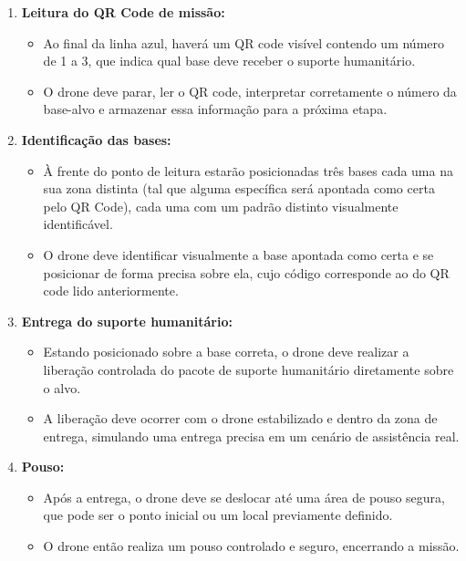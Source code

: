\begin{itemize}
\begin{itemize}
\begin{enumerate}
            \item \textbf{Leitura do QR Code de missão:}
            \begin{itemize}
                \item Ao final da linha azul, haverá um QR code visível contendo um número de 1 a 3, que indica qual base deve receber o suporte humanitário.
                \item O drone deve parar, ler o QR code, interpretar corretamente o número da base-alvo e armazenar essa informação para a próxima etapa.
            \end{itemize}
            
            \item \textbf{Identificação das bases:}
            \begin{itemize}
                \item À frente do ponto de leitura estarão posicionadas três bases {\color{red}cada uma na sua zona distinta (tal que alguma específica será apontada como certa pelo QR Code), cada uma com um padrão distinto visualmente identificável.}
                \item {\color{red}O drone deve identificar visualmente a base apontada como certa e se posicionar de forma precisa sobre ela, cujo código corresponde ao do QR code lido anteriormente.}
            \end{itemize}
            
            \item \textbf{Entrega do suporte humanitário:}
            \begin{itemize}
                \item Estando posicionado sobre a base correta, o drone deve realizar a liberação controlada do pacote de suporte humanitário diretamente sobre o alvo.
                \item A liberação deve ocorrer com o drone estabilizado e dentro da zona de entrega, simulando uma entrega precisa em um cenário de assistência real.
            \end{itemize}
            
            \item \textbf{Pouso:}
            \begin{itemize}
                \item Após a entrega, o drone deve se deslocar até uma área de pouso segura, que pode ser o ponto inicial ou um local previamente definido.
                \item O drone então realiza um pouso controlado e seguro, encerrando a missão.
            \end{itemize}
        \end{enumerate}
        

\end{itemize}
\end{itemize}
